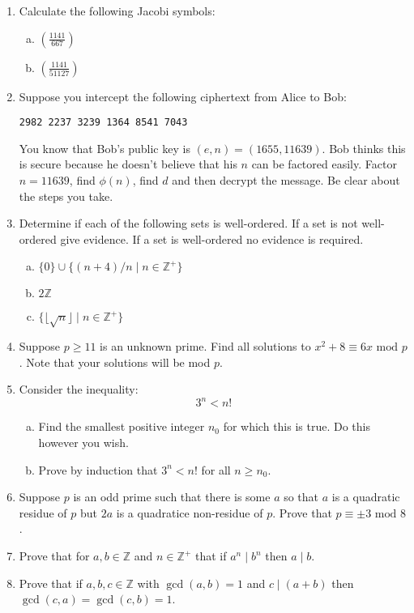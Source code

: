 \documentclass[class=article, crop=false]{standalone}
\def\integers{{\mathbb Z}}
\def\leg#1#2{\left(\frac{#1}{#2}\right)}
\begin{document}
\begin{enumerate}[1.]
	\item Calculate the following Jacobi symbols:
	\begin{enumerate}[(a)]
		\item $\leg{1141}{667}$
		\item $\leg{1141}{51127}$
	\end{enumerate}

	\item Suppose you intercept the following ciphertext from Alice to Bob:
	\begin{center}
		\verb|2982 2237 3239 1364 8541 7043|
	\end{center}
	You know that Bob's public key is $(e,n)=(1655, 11639)$. Bob thinks this is secure because he
	doesn't believe that his $n$ can be factored easily. Factor $n=11639$, find $\phi(n)$, find $d$ and then
	decrypt the message. Be clear about the steps you take.

	\item Determine if each of the following sets is well-ordered. If a set is not well-ordered give evidence.
	If a set is well-ordered no evidence is required. 
	\begin{enumerate}[(a)]
		\item $\{0\}\cup \{(n+4)/n \mid n\in\integers^+\}$
		\item $2\integers$
		\item $\{\lfloor\sqrt{n}\rfloor \mid n\in\integers^+\}$
	\end{enumerate}

	\item Suppose $p\geq 11$ is an unknown prime. Find all solutions to $x^2+8\equiv 6x\mbox{ mod }p$. Note that
	your solutions will be mod $p$.

	\item Consider the inequality: $$3^n<n!$$
	\begin{enumerate}[(a)]
		\item Find the smallest positive integer $n_0$ for which this is true. Do this however you wish.
		\item Prove by induction that $3^n<n!$ for all $n\geq n_0$.
	\end{enumerate}

	\item Suppose $p$ is an odd prime such that there is some $a$ so that $a$ is a quadratic residue of $p$
	but $2a$ is a quadratice non-residue of $p$. Prove that $p\equiv \pm 3\mbox{ mod }8$.

	\item Prove that for $a,b\in\integers$ and $n\in\integers^+$ that if $a^n\mid b^n$ then $a\mid b$.
	
	\item Prove that if $a,b,c\in\integers$ with $\gcd(a,b)=1$ and $c\mid (a+b)$ then $\gcd(c,a)=\gcd(c,b)=1$.
\end{enumerate}
\end{document}

